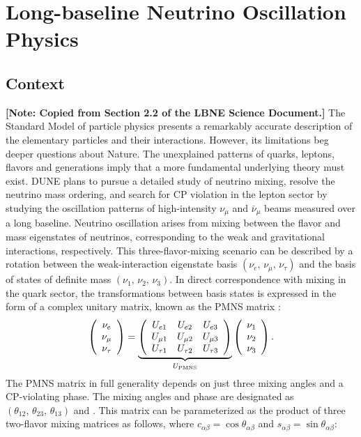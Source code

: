 \chapter{Long-baseline Neutrino Oscillation Physics}
\label{ch:physics-lbnosc}

\section{Context}
\label{sec:physics-lbnosc-context}

{\bf [Note: Copied from Section 2.2 of the LBNE Science Document.]}  
The Standard Model of particle physics 
presents a remarkably accurate
description of the elementary particles and their
interactions. However, its limitations beg deeper questions about
Nature. The unexplained patterns of quarks, leptons, flavors and
generations imply that a more fundamental underlying theory must
exist.  
DUNE plans to pursue a detailed
study of neutrino mixing, resolve the neutrino mass ordering,
and search for CP violation in the lepton sector by
studying the oscillation patterns of high-intensity
$\nu_\mu$ and $\overline{\nu}_\mu$ beams measured over a long baseline. 
Neutrino oscillation arises from mixing between the flavor and mass eigenstates of neutrinos,
corresponding to the weak and gravitational interactions, respectively. 
This three-flavor-mixing
scenario can be described by a rotation between the weak-interaction
eigenstate basis $(\nu_e,\, \nu_\mu,\, \nu_\tau)$ and the basis of
states of definite mass $(\nu_1,\, \nu_2,\, \nu_3)$.  In direct
correspondence with mixing in the quark sector, the transformations
between basis states is expressed in the form of a complex unitary
matrix, known as the PMNS matrix :
\begin{equation}
\left(\begin{array}{ccc} \nu_e \\ \nu_\mu \\ \nu_\tau \end{array} \right)= 
\underbrace{
  \left(\begin{array}{ccc}
      U_{e 1} &  U_{e 2} & U_{e 3} \\ 
      U_{\mu1} &  U_{\mu2} & U_{\mu 3} \\ 
      U_{\tau 1} &  U_{\tau 2} & U_{\tau 3} 
    \end{array} \right)
}_{U_{\rm PMNS}} \left(\begin{array}{ccc} \nu_1 \\ \nu_2 \\ \nu_3 \end{array} \right).
\label{eqn:pmns0}
\end{equation}
The PMNS matrix in full generality depends on just three mixing angles
and a CP-violating phase.  The mixing angles and phase are designated
as $(\theta_{12},\, \theta_{23},\, \theta_{13})$ and
\deltacp.  %
This matrix can be parameterized as the product of three
two-flavor mixing matrices as follows, where $c_{\alpha \beta}=\cos \theta_{\alpha \beta}$ and $s_{\alpha
  \beta}=\sin \theta_{\alpha \beta}$:

